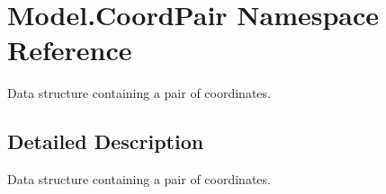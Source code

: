 \hypertarget{namespaceModel_1_1CoordPair}{}\section{Model.\+Coord\+Pair Namespace Reference}
\label{namespaceModel_1_1CoordPair}


Data structure containing a pair of coordinates.  




\subsection{Detailed Description}
Data structure containing a pair of coordinates. 

